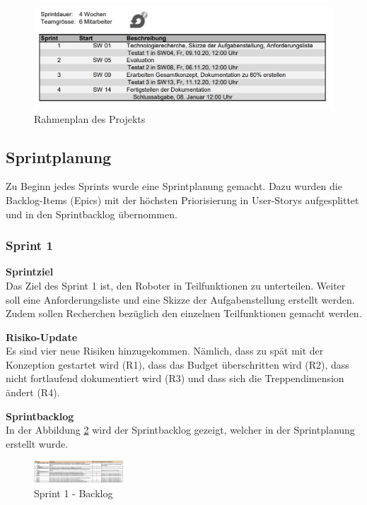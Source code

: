 \begin{figure}[H]
  \includegraphics[width=1.0\textwidth]{img/projektmanagement/Rahmenplan.PNG}
  \centering
  \caption{Rahmenplan des Projekts}
  \label{fig:rahmenplan}
\end{figure}

\subsection{Sprintplanung}
Zu Beginn jedes Sprints wurde eine Sprintplanung gemacht. Dazu wurden die Backlog-Items (Epics) mit der höchsten Priorisierung in User-Storys aufgesplittet und in den Sprintbacklog übernommen. 

\subsubsection{Sprint 1}
\textbf{Sprintziel}\\
Das Ziel des Sprint 1 ist, den Roboter in Teilfunktionen zu unterteilen. Weiter soll eine Anforderungsliste und eine Skizze der Aufgabenstellung erstellt werden. Zudem sollen Recherchen bezüglich den einzelnen Teilfunktionen gemacht werden.

\textbf{Risiko-Update}\\
Es sind vier neue Risiken hinzugekommen. Nämlich, dass zu spät mit der Konzeption gestartet wird (R1), dass das Budget überschritten wird (R2), dass nicht fortlaufend dokumentiert wird (R3) und dass sich die Treppendimension ändert (R4).

\textbf{Sprintbacklog}\\
In der Abbildung \ref{fig:sprint-backlog-1} wird der Sprintbacklog gezeigt, welcher in der Sprintplanung erstellt wurde.
\begin{figure}[H]
  \includegraphics[angle=270,width=0.3\textwidth]{img/projektmanagement/sprint1-backlog.PNG}
  \centering
  \caption{Sprint 1 - Backlog}
  \label{fig:sprint-backlog-1}
\end{figure}

